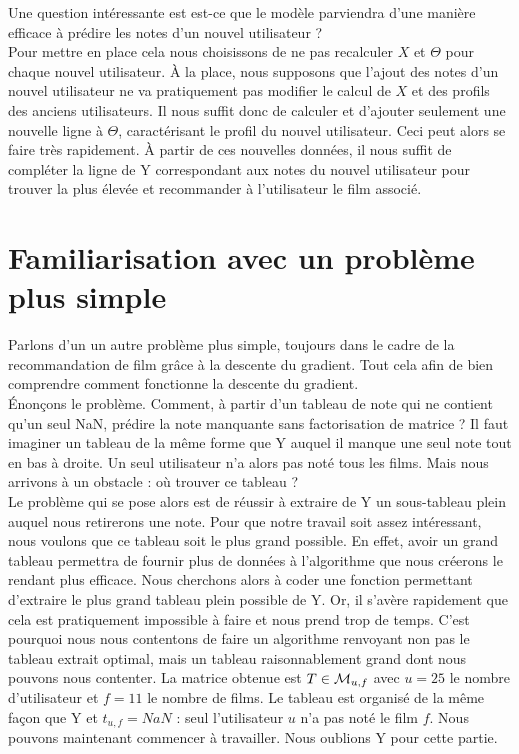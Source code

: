 \documentclass[a4paper,10pt]{article}
\begin{document}
Une question intéressante est est-ce que le modèle parviendra d'une manière efficace à prédire les notes d'un nouvel utilisateur ?\\

Pour mettre en place cela nous choisissons de ne pas recalculer $X$ et $\Theta$ pour chaque nouvel utilisateur. À la place, nous supposons que l'ajout des notes d'un nouvel utilisateur ne va pratiquement pas modifier le calcul de $X$ et des profils des anciens utilisateurs. Il nous suffit donc de calculer et d'ajouter seulement une nouvelle ligne à $\Theta$, caractérisant le profil du nouvel utilisateur. Ceci peut alors se faire très rapidement. À partir de ces nouvelles données, il nous suffit de compléter la ligne de Y correspondant aux notes du nouvel utilisateur pour trouver la plus élevée et recommander à l'utilisateur le film associé.

\newpage

\section{Familiarisation avec un problème plus simple}
\label{extrait}

Parlons d'un un autre problème plus simple, toujours dans le cadre de la recommandation de film grâce à la descente du gradient. Tout cela afin de bien comprendre comment fonctionne la descente du gradient.\\

Énonçons le problème. Comment, à partir d'un tableau de note qui ne contient qu'un seul NaN, prédire la note manquante sans factorisation de matrice ? Il faut imaginer un tableau de la même forme que Y auquel il manque une seul note tout en bas à droite. Un seul utilisateur n'a alors pas noté tous les films. Mais nous arrivons à un obstacle : où trouver ce tableau ?\\

Le problème qui se pose alors est de réussir à extraire de Y un sous-tableau plein auquel nous retirerons une note. Pour que notre travail soit assez intéressant, nous voulons que ce tableau soit le plus grand possible. En effet, avoir un grand tableau permettra de fournir plus de données à l'algorithme que nous créerons le rendant plus efficace. Nous cherchons alors à coder une fonction permettant d'extraire le plus grand tableau plein possible de Y. Or, il s'avère rapidement que cela est pratiquement impossible à faire et nous prend trop de temps. C'est pourquoi nous nous contentons de faire un algorithme renvoyant non pas le tableau extrait optimal, mais un tableau raisonnablement grand dont nous pouvons nous contenter. La matrice obtenue est $T \in {\cal M}_{u, f}$ avec $u = 25$ le nombre d'utilisateur et $f = 11$ le nombre de films. Le tableau est organisé de la même façon que Y et $t_{u, f} = NaN$ : seul l'utilisateur $u$ n'a pas noté le film $f$. Nous pouvons maintenant commencer à travailler. Nous oublions Y pour cette partie.\\
\end{document}
